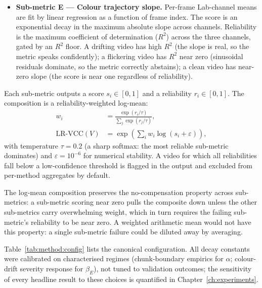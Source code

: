 \begin{itemize}
    \item \textbf{Sub-metric E --- Colour trajectory slope.} Per-frame Lab-channel means
          are fit by linear regression as a function of frame index. The score is an
          exponential decay in the maximum absolute slope across channels. Reliability is
          the maximum coefficient of determination ($R^2$) across the three channels,
          gated by an $R^2$ floor. A drifting video has high $R^2$ (the slope is real, so
          the metric speaks confidently); a flickering video has $R^2$ near zero
          (sinusoidal residuals dominate, so the metric correctly abstains); a clean
          video has near-zero slope (the score is near one regardless of reliability).
\end{itemize}

Each sub-metric outputs a score $s_i \in [0, 1]$ and a reliability $r_i \in [0, 1]$. The
composition is a reliability-weighted log-mean:
\begin{align}
    w_i &= \frac{\exp(r_i / \tau)}{\sum_j \exp(r_j / \tau)}, \\
    \text{LR-VCC}(V) &= \exp\!\left(\sum_{i} w_i \log(s_i + \varepsilon)\right),
\end{align}
with temperature $\tau = 0.2$ (a sharp softmax: the most reliable sub-metric dominates)
and $\varepsilon = 10^{-6}$ for numerical stability. A video for which all reliabilities
fall below a low-confidence threshold is flagged in the output and excluded from
per-method aggregates by default.

The log-mean composition preserves the no-compensation property across sub-metrics: a
sub-metric scoring near zero pulls the composite down unless the other sub-metrics carry
overwhelming weight, which in turn requires the failing sub-metric's reliability to be
near zero. A weighted arithmetic mean would not have this property: a single sub-metric
failure could be diluted away by averaging.

Table~\ref{tab:method:config} lists the canonical configuration. All decay constants
were calibrated on characterised regimes (chunk-boundary empirics for $\alpha$;
colour-drift severity response for $\beta_E$), not tuned to validation outcomes; the
sensitivity of every headline result to these choices is quantified in
Chapter~\ref{ch:experiments}.

